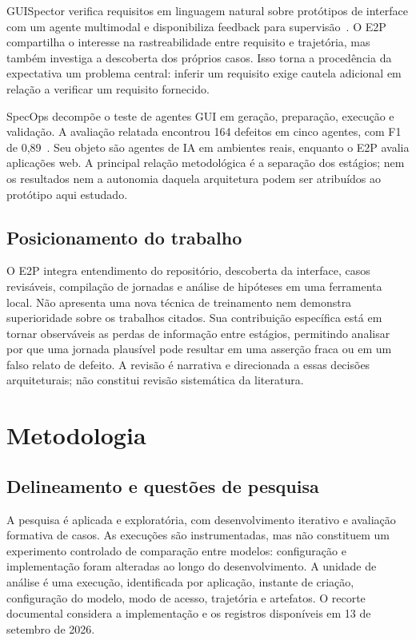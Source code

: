 \documentclass[12pt]{article}
\begin{document}
GUISpector verifica requisitos em linguagem natural sobre protótipos de interface com um agente multimodal e disponibiliza feedback para supervisão~\cite{kolthoff2025guispector}. O E2P compartilha o interesse na rastreabilidade entre requisito e trajetória, mas também investiga a descoberta dos próprios casos. Isso torna a procedência da expectativa um problema central: inferir um requisito exige cautela adicional em relação a verificar um requisito fornecido.

SpecOps decompõe o teste de agentes GUI em geração, preparação, execução e validação. A avaliação relatada encontrou 164 defeitos em cinco agentes, com F1 de 0,89~\cite{ahmed2026specops}. Seu objeto são agentes de IA em ambientes reais, enquanto o E2P avalia aplicações web. A principal relação metodológica é a separação dos estágios; nem os resultados nem a autonomia daquela arquitetura podem ser atribuídos ao protótipo aqui estudado.

\subsection{Posicionamento do trabalho}
O E2P integra entendimento do repositório, descoberta da interface, casos revisáveis, compilação de jornadas e análise de hipóteses em uma ferramenta local. Não apresenta uma nova técnica de treinamento nem demonstra superioridade sobre os trabalhos citados. Sua contribuição específica está em tornar observáveis as perdas de informação entre estágios, permitindo analisar por que uma jornada plausível pode resultar em uma asserção fraca ou em um falso relato de defeito. A revisão é narrativa e direcionada a essas decisões arquiteturais; não constitui revisão sistemática da literatura.

\section{Metodologia}\label{sec:method}
\subsection{Delineamento e questões de pesquisa}
A pesquisa é aplicada e exploratória, com desenvolvimento iterativo e avaliação formativa de casos. As execuções são instrumentadas, mas não constituem um experimento controlado de comparação entre modelos: configuração e implementação foram alteradas ao longo do desenvolvimento. A unidade de análise é uma execução, identificada por aplicação, instante de criação, configuração do modelo, modo de acesso, trajetória e artefatos. O recorte documental considera a implementação e os registros disponíveis em 13 de setembro de 2026.
\end{document}
